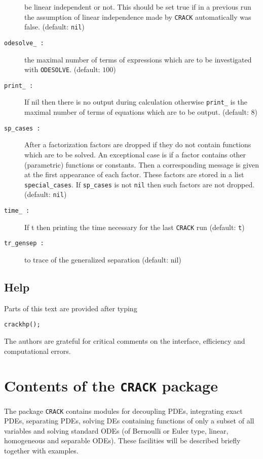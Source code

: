 \begin{description}
             be linear independent or not. This should be set true if
             in a previous run the assumption of linear independence made by
             {\tt CRACK} automatically was false. (default: {\tt nil})
\item[{\tt odesolve\_ :}] the maximal number of terms of expressions which
             are to be
             investigated with {\tt ODESOLVE}.  (default: $100$)
\item[{\tt print\_ :}] If nil then there is no output during calculation
             otherwise {\tt print\_} is the maximal number of terms
             of equations which are to be output. (default: 8)
\item[{\tt sp\_cases :}] After a factorization factors are dropped
             if they do not contain functions which are to be solved. An
             exceptional case is if a factor contains other (parametric)
             functions or constants. Then a corresponding message is given
             at the first appearance of each factor. These factors are
             stored in a list {\tt special\_cases}. If {\tt sp\_cases}
             is not {\tt nil} then such factors are not dropped.
             (default: {\tt nil})
\item[{\tt time\_ :}] If t then printing the time necessary for the last
             {\tt CRACK} run (default: {\tt t})
\item[{\tt tr\_gensep :}] to trace of the generalized separation
             (default: nil)
\end{description}

\subsection{Help}
Parts of this text are provided after typing

{\tt crackhp();}

The authors are grateful for critical comments
on the interface, efficiency and computational errors.

\section{Contents of the {\tt CRACK} package}
The package {\tt CRACK} contains modules for decoupling PDEs, integrating
exact PDEs, separating PDEs, solving DEs containing functions of only
a subset of all variables and solving standard ODEs (of Bernoulli or
Euler type, linear, homogeneous and separable ODEs). These facilities
will be described briefly together with examples.

